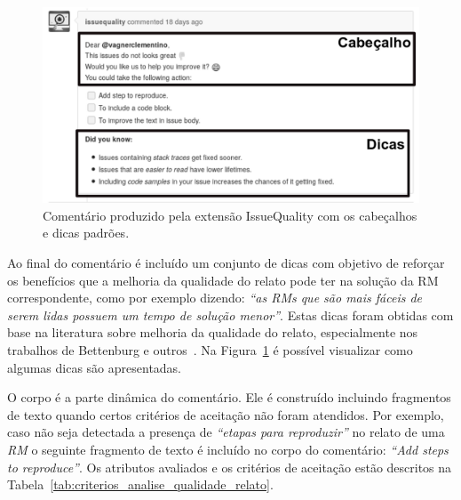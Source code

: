 \begin{figure}[htpb]
    \centering
    \includegraphics[width=0.8\linewidth]{chapter-implementacao-extensoes-fgrm/img/issue_original.png}
    \caption{Comentário produzido pela extensão IssueQuality com os cabeçalhos e
        dicas padrões.}
\label{fig:issue_original}
\end{figure}

Ao final do comentário é incluído um conjunto de dicas com objetivo de reforçar
os benefícios que a melhoria da qualidade do relato pode ter na solução da RM
correspondente, como por exemplo dizendo: \textit{``as RMs que são mais fáceis
    de serem lidas possuem um tempo de solução menor''}. Estas dicas foram
obtidas com base na literatura sobre melhoria da qualidade do relato,
especialmente nos trabalhos de Bettenburg e outros~\cite{bettenburg2007quality,
    bettenburg2008makes}. Na Figura~\ref{fig:issue_original} é possível
visualizar como algumas dicas são apresentadas.

O corpo é a parte dinâmica do comentário. Ele é construído incluindo fragmentos
de texto quando certos critérios de aceitação não foram atendidos.  Por
exemplo, caso não seja detectada a presença de \textit{``etapas para
    reproduzir''} no relato de uma \textit{RM} o seguinte fragmento de texto é
incluído no corpo do comentário: \textit{``Add steps to reproduce''}. Os
atributos avaliados e os critérios de aceitação estão descritos na
Tabela~\ref{tab:criterios_analise_qualidade_relato}.

